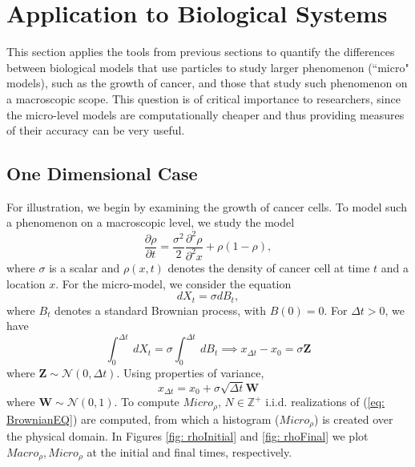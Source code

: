 \documentclass[10pt]{article}
\begin{document}
 
 


\section{Application to Biological Systems}
\label{sec: BioSystems}
This section applies the tools from previous sections to quantify the differences between biological models that use particles to study larger phenomenon (``micro" models), such as the growth of cancer, and those that study such phenomenon on a macroscopic scope. This question is of critical importance to researchers, since the micro-level models are computationally cheaper and thus providing measures of their accuracy can be very useful. 

\subsection{One Dimensional Case}
For illustration, we begin by examining the growth of cancer cells. To model such a phenomenon on a macroscopic level, we study the model
\begin{equation}
\frac{\partial \rho}{\partial t}  = \frac{\sigma^2}{2}\frac{\partial^2 \rho}{\partial^2 x} + \rho(1-\rho),
\label{eq: MacroModel}
\end{equation}
where $\sigma$ is a scalar and $\rho(x,t)$ denotes the density of cancer cell at time $t$ and a location $x$. For the micro-model, we consider the equation
\begin{equation}
dX_t = \sigma dB_t,
\label{eq: MicroModel}
\end{equation}
where $B_t$ denotes a standard Brownian process, with $B(0) = 0$. For $\Delta t > 0$, we have
\begin{equation}
\int_0^{\Delta t} \ dX_t = \sigma \int_{0}^{\Delta t} \ dB_t \implies x_{\Delta t} - x_0 = \sigma \textbf{Z}
\end{equation}
where $\textbf{Z} \sim \mathcal{N}(0, \Delta t)$. Using properties of variance, 
\begin{equation}
x_{\Delta t} = x_0 + \sigma \sqrt{\Delta t}\textbf{W}
\label{eq: BrownianEQ}
\end{equation} 
where $\textbf{W} \sim \mathcal{N}(0, 1)$. To compute $Micro_{\rho}$, $N \in \mathbb{Z}^+$ i.i.d. realizations of (\ref{eq: BrownianEQ}) are computed, from which a histogram ($Micro_{\rho}$) is created over the physical domain.  In Figures \ref{fig: rhoInitial} and \ref{fig: rhoFinal} we plot $Macro_{\rho}, Micro_{\rho}$ at the initial and final times, respectively.
\end{document}
